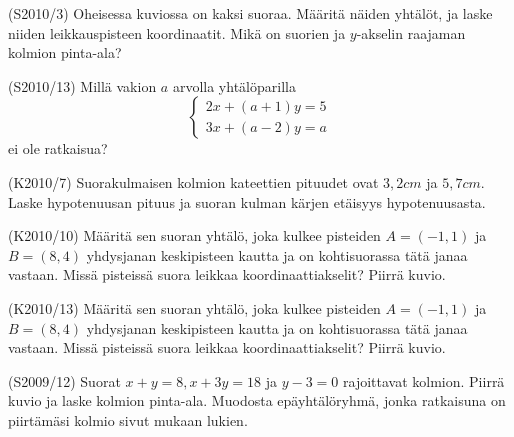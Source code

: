 \begin{tehtava}  (S2010/3)
Oheisessa kuviossa on kaksi suoraa. Määritä näiden yhtälöt, ja laske niiden leikkauspisteen koordinaatit. Mikä on suorien ja $y$-akselin raajaman kolmion pinta-ala?
\end{tehtava}


\begin{tehtava}  (S2010/13)
Millä vakion $a$ arvolla yhtälöparilla 
\[
\left\{
\begin{aligned}
 2x+(a+1)y=5  \\
 3x+(a-2)y=a  
\end{aligned}
\right. 
\]
ei ole ratkaisua?
\end{tehtava}

\begin{tehtava}  (K2010/7)
Suorakulmaisen kolmion kateettien pituudet ovat $3,2 cm$ ja $5,7 cm$. Laske hypotenuusan pituus ja suoran kulman kärjen etäisyys hypotenuusasta.
\end{tehtava}

\begin{tehtava}  (K2010/10)
Määritä sen suoran yhtälö, joka kulkee pisteiden $A=(-1,1)$ ja $B=(8,4)$ yhdysjanan keskipisteen kautta ja on kohtisuorassa tätä janaa vastaan. Missä pisteissä suora leikkaa koordinaattiakselit? Piirrä kuvio.
\end{tehtava}

\begin{tehtava}  (K2010/13)
Määritä sen suoran yhtälö, joka kulkee pisteiden $A=(-1,1)$ ja $B=(8,4)$ yhdysjanan keskipisteen kautta ja on kohtisuorassa tätä janaa vastaan. Missä pisteissä suora leikkaa koordinaattiakselit? Piirrä kuvio.
\end{tehtava}


\begin{tehtava}  (S2009/12)
Suorat $x+y=8, x+3y=18$ ja $y-3=0$ rajoittavat kolmion. Piirrä kuvio ja laske kolmion pinta-ala. Muodosta epäyhtälöryhmä, jonka ratkaisuna on piirtämäsi kolmio sivut mukaan lukien.
\end{tehtava}

